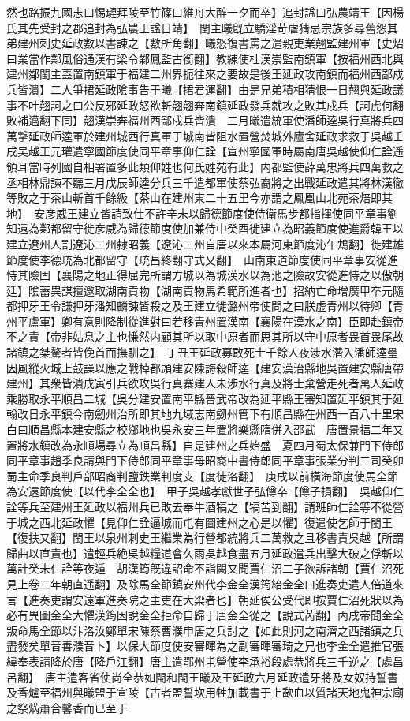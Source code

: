 然也路振九國志曰惕璉拜陵至竹篠口維舟大醉一夕而卒】追封諡曰弘農靖王【因楊氏其先受封之郡追封為弘農王諡日靖】　閩主曦旣立驕淫苛虐猜忌宗族多尋舊怨其弟建州刺史延政數以書諫之【數所角翻】曦怒復書罵之遣親吏業翹監建州軍【史炤曰業當作鄴風俗通漢有梁令鄴鳳監古銜翻】教練使杜漢崇監南鎮軍【按福州西北與建州鄰閩主蓋置南鎮軍于福建二州界扼往來之要故是後王延政攻南鎮而福州西鄙戍兵皆潰】二人爭捃延政隂事告于曦【捃君運翻】由是兄弟積相猜恨一日翹與延政議事不叶翹訶之曰公反邪延政怒欲斬翹翹奔南鎮延政發兵就攻之敗其戍兵【訶虎何翻敗補邁翻下同】翹漢崇奔福州西鄙戍兵皆潰　二月曦遣統軍使潘師逵吳行真將兵四萬撃延政師逵軍於建州城西行真軍于城南皆阻水置營焚城外廬舍延政求救于吳越壬戌吴越王元瓘遣寧國節度使同平章事仰仁詮【宣州寧國軍時屬南唐吳越使仰仁詮遥領耳當時列國自相署置多此類仰姓也何氏姓苑有此】内都監使薛萬忠將兵四萬救之丞相林鼎諫不聽三月戊辰師逵分兵三千遣都軍使蔡弘裔將之出戰延政遣其將林漢徹等敗之于茶山斬首千餘級【茶山在建州東二十五里今亦謂之鳳凰山北苑茶焙即其地】　安彦威王建立皆請致仕不許辛未以歸德節度使侍衛馬步都指揮使同平章事劉知遠為鄴都留守徙彦威為歸德節度使加兼侍中癸酉徙建立為昭義節度使進爵韓王以建立遼州人割遼沁二州隸昭義【遼沁二州自唐以來本屬河東節度沁午鴆翻】徙建雄節度使李德珫為北都留守【珫昌終翻守式乂翻】　山南東道節度使同平章事安從進恃其險固【襄陽之地正得屈完所謂方城以為城漢水以為池之險故安從進恃之以傲朝廷】隂蓄異謀擅邀取湖南貢物【湖南貢物馬希範所進者也】招納亡命增廣甲卒元隨都押牙王令謙押牙潘知麟諫皆殺之及王建立徙潞州帝使問之曰朕虚青州以待卿【青州平盧軍】卿有意則降制從進對曰若移青州置漢南【襄陽在漢水之南】臣即赴鎮帝不之責【帝非姑息之主也慊然内顧其所以取中原者而思其所以守中原者畏首畏尾故諸鎮之桀驁者皆俛首而撫馴之】　丁丑王延政募敢死士千餘人夜涉水濳入潘師逵壘因風縱火城上鼓譟以應之戰棹都頭建安陳誨殺師逵【建安漢治縣地吳置建安縣唐帶建州】其衆皆潰戊寅引兵欲攻吳行真寨建人未涉水行真及將士棄營走死者萬人延政乘勝取永平順昌二城【吳分建安置南平縣晉武帝改為延平縣王審知置延平鎮其于延翰改日永平鎮今南劒州治所即其地九域志南劒州管下有順昌縣在州西一百八十里宋白曰順昌縣本建安縣之校鄉地也吳永安三年置將樂縣隋併入邵武　唐置景福二年又置將水鎮改為永順場尋立為順昌縣】自是建州之兵始盛　夏四月蜀太保兼門下侍郎同平章事趙季良請與門下侍郎同平章事母昭裔中書侍郎同平章事張業分判三司癸卯蜀主命季良判戶部昭裔判鹽鉄業判度支【度徒洛翻】　庚戌以前橫海節度使馬全節為安遠節度使【以代李全全也】　甲子吳越孝獻世子弘僔卒【僔子損翻】　吳越仰仁詮等兵至建州王延政以福州兵已敗去奉牛酒犒之【犒苦到翻】請班師仁詮等不從營于城之西北延政懼【見仰仁詮逼城而屯有圖建州之心是以懼】復遣使乞師于閩王【復扶又翻】閩王以泉州刺史王繼業為行營都統將兵二萬救之且移書責吳越【所謂歸曲以直責也】遣輕兵絶吳越糧道會久雨吳越食盡五月延政遣兵出擊大破之俘斬以萬計癸未仁詮等夜遁　胡漢筠旣違詔命不詣闕又聞賈仁沼二子欲訴諸朝【賈仁沼死見上卷二年朝直遥翻】及除馬全節鎮安州代李金全漢筠紿金全曰進奏吏遣人倍道來言【進奏吏謂安遠軍進奏院之主吏在大梁者也】朝延俟公受代即按賈仁沼死狀以為必有異圖金全大懼漢筠因說金全拒命自歸于唐金全從之【說式芮翻】丙戌帝聞金全叛命馬全節以汴洛汝鄭單宋陳蔡曹濮申唐之兵討之【如此則河之南濟之西諸鎮之兵盡發矣單音善濮音卜】以保大節度使安審暉為之副審暉審琦之兄也李金全遣推官張緯奉表請降於唐【降戶江翻】唐主遣鄂州屯營使李承裕段處恭將兵三千逆之【處昌呂翻】　唐主遣客省使尚全恭如閩和閩王曦及王延政六月延政遣牙將及女奴持誓書及香爐至福州與曦盟于宣陵【古者盟誓坎用牲加載書于上歃血以質諸天地鬼神宗廟之祭焫蕭合馨香而已至于